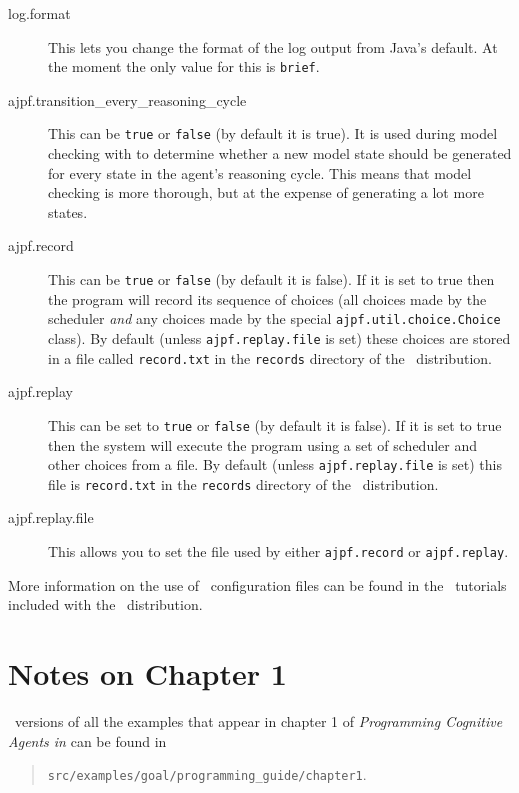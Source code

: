 \begin{sloppypar}
\begin{description}
\item[log.format] This lets you change the format of the log output from Java's default.  At the moment the only value for this is \texttt{brief}.
\item[ajpf.transition\_every\_reasoning\_cycle] This can be \texttt{true} or \texttt{false} (by default it is true).  It is used during model checking with \ajpf{} to determine whether a new model state should be generated for every state in the agent's reasoning cycle.  This means that model checking is more thorough, but at the expense of generating a lot more states.
\item[ajpf.record] This can be \texttt{true} or \texttt{false} (by default  it is false).  If it is set to true then the program will record its sequence of choices (all choices made by the scheduler \emph{and} any choices made by the special \texttt{ajpf.util.choice.Choice} class).  By default (unless \texttt{ajpf.replay.file} is set) these choices are stored in a file called \texttt{record.txt} in the \texttt{records} directory of the \mcapl\ distribution.
\item[ajpf.replay] This can be set to \texttt{true} or \texttt{false} (by default it is false).  If it is set to true then the system will execute the program using a set of scheduler and other choices from a file.  By default (unless \texttt{ajpf.replay.file} is set) this  file is  \texttt{record.txt} in the \texttt{records} directory of the \mcapl\ distribution.
\item[ajpf.replay.file] This allows you to set the file used by either \texttt{ajpf.record} or \texttt{ajpf.replay}.
\end{description}
\end{sloppypar}

More information on the use of \ail\ configuration files can be found in the \ail\ tutorials included with the \mcapl\ distribution.

\section{Notes on Chapter 1}

\ail\ versions of all the examples that appear in chapter 1 of \emph{Programming Cognitive Agents in \goal} can be found in
\begin{quote}
  \texttt{src/examples/goal/programming\_guide/chapter1}.
\end{quote}

